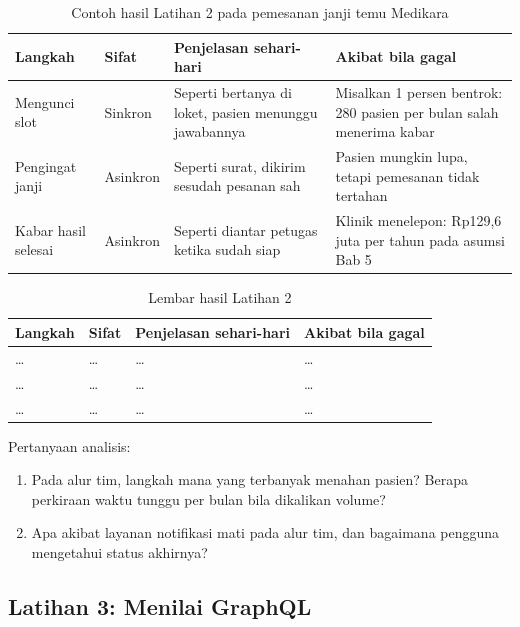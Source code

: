 \begin{table}[!htb]
  \centering
  \caption{Contoh hasil Latihan 2 pada pemesanan janji temu Medikara}
  \label{tab:ch05-lat2-contoh}
  \small
  \begin{tabularx}{\textwidth}{V{2.3cm}V{1.5cm}UU}
    \hline
    \textbf{Langkah} & \textbf{Sifat} & \textbf{Penjelasan sehari-hari} & \textbf{Akibat bila gagal} \\ \hline
    Mengunci slot & Sinkron & Seperti bertanya di loket, pasien menunggu jawabannya & Misalkan 1 persen bentrok: 280 pasien per bulan salah menerima kabar \\ \hline
    Pengingat janji & Asinkron & Seperti surat, dikirim sesudah pesanan sah & Pasien mungkin lupa, tetapi pemesanan tidak tertahan \\ \hline
    Kabar hasil selesai & Asinkron & Seperti diantar petugas ketika sudah siap & Klinik menelepon: Rp129,6 juta per tahun pada asumsi Bab 5 \\ \hline
  \end{tabularx}
\end{table}

\begin{table}[!htb]
  \centering
  \caption{Lembar hasil Latihan 2}
  \label{tab:ch05-lat2-hasil}
  \small
  \begin{tabularx}{\textwidth}{V{2.3cm}V{1.5cm}UU}
    \hline
    \textbf{Langkah} & \textbf{Sifat} & \textbf{Penjelasan sehari-hari} & \textbf{Akibat bila gagal} \\ \hline
    \dots & \dots & \dots & \dots \\ \hline
    \dots & \dots & \dots & \dots \\ \hline
    \dots & \dots & \dots & \dots \\ \hline
  \end{tabularx}
\end{table}

Pertanyaan analisis:
\begin{enumerate}
  \item Pada alur tim, langkah mana yang terbanyak menahan pasien? Berapa perkiraan waktu tunggu per bulan bila dikalikan volume?
  \item Apa akibat layanan notifikasi mati pada alur tim, dan bagaimana pengguna mengetahui status akhirnya?
\end{enumerate}

\subsection*{Latihan 3: Menilai GraphQL}

